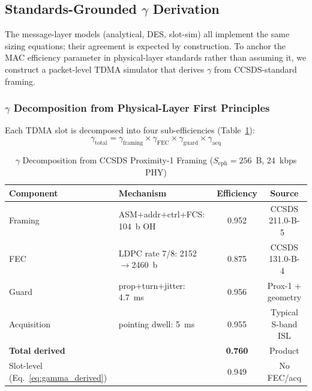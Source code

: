 \documentclass[journal]{IEEEtran}
\begin{document}
\subsection{Standards-Grounded $\gamma$ Derivation}
\label{sec:packet_validation}

The message-layer models (analytical, DES, slot-sim) all implement the same sizing equations; their agreement is expected by construction. To anchor the MAC efficiency parameter in physical-layer standards rather than assuming it, we construct a packet-level TDMA simulator that derives $\gamma$ from CCSDS-standard framing.

\subsubsection{$\gamma$ Decomposition from Physical-Layer First Principles}

Each TDMA slot is decomposed into four sub-efficiencies (Table~\ref{tab:gamma_decomposition}):
\begin{equation}
    \gamma_{\text{total}} = \gamma_{\text{framing}} \times \gamma_{\text{FEC}} \times \gamma_{\text{guard}} \times \gamma_{\text{acq}}
    \label{eq:gamma_decomposition}
\end{equation}

\begin{table}[t]
    \centering
    \caption{$\gamma$ Decomposition from CCSDS Proximity-1 Framing ($S_{\text{eph}} = 256$~B, 24~kbps PHY)}
    \label{tab:gamma_decomposition}
    \footnotesize
    \begin{tabular}{@{}llcc@{}}
        \toprule
        \textbf{Component} & \textbf{Mechanism} & \textbf{Efficiency} & \textbf{Source} \\
        \midrule
        Framing & ASM+addr+ctrl+FCS: 104~b OH & 0.952 & CCSDS 211.0-B-5~\cite{ccsds_prox1} \\
        FEC & LDPC rate 7/8: 2152$\to$2460~b & 0.875 & CCSDS 131.0-B-4~\cite{ccsds_sync_coding} \\
        Guard & prop+turn+jitter: 4.7~ms & 0.956 & Prox-1 + geometry \\
        Acquisition & pointing dwell: 5~ms & 0.955 & Typical S-band ISL \\
        \midrule
        \textbf{Total derived} & & \textbf{0.760} & Product \\
        Slot-level (Eq.~\ref{eq:gamma_derived}) & & 0.949 & No FEC/acq \\
        \bottomrule
    \end{tabular}
\end{table}
\end{document}
